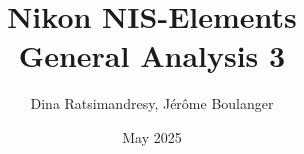 \documentclass[a4paper,DIV=17,dvipsnames,headsepline]{scrartcl}
\title{Nikon NIS-Elements\\ General Analysis 3}
\author{Dina Ratsimandresy, Jérôme Boulanger}
\date{May 2025}
\begin{document}
\maketitle


 
\newpage

\newpage

\newpage

\newpage

% 
% 
% 

\appendix
\printendnotes
\end{document}
